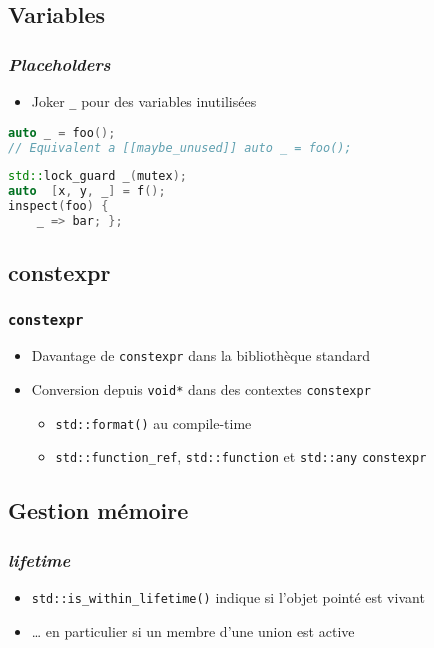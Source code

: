 \documentclass[C++.tex]{subfiles}
\begin{document}
\subsection*{Variables}
\begin{frame}[fragile]
	\frametitle{\textit{Placeholders}}
	\begin{itemize}
		\item Joker \lstinline|_| pour des variables inutilisées
	\end{itemize}
	
	\begin{lstlisting}[language=C++]
auto _ = foo();
// Equivalent a [[maybe_unused]] auto _ = foo();\end{lstlisting}

	\begin{lstlisting}[language=C++]
std::lock_guard _(mutex);
auto  [x, y, _] = f();
inspect(foo) { 
	_ => bar; };\end{lstlisting}
\end{frame}

\subsection*{constexpr}
\begin{frame}[fragile]
	\frametitle{\lstinline|constexpr|}
	\begin{itemize}
		\item Davantage de \lstinline|constexpr| dans la bibliothèque standard
		\item Conversion depuis \lstinline|void*| dans des contextes \lstinline|constexpr|
		\begin{itemize}
			\item \lstinline|std::format()| au compile-time
			\item \lstinline|std::function_ref|, \lstinline|std::function| et \lstinline|std::any| \lstinline|constexpr|
		\end{itemize}
	\end{itemize}
\end{frame}

\subsection*{Gestion mémoire}
\begin{frame}[fragile]
	\frametitle{\textit{lifetime}}
	\begin{itemize}
		\item \lstinline|std::is_within_lifetime()| indique si l'objet pointé est vivant
		\item \ldots{} en particulier si un membre d'une union est active
	\end{itemize}
\end{frame}
\end{document}
